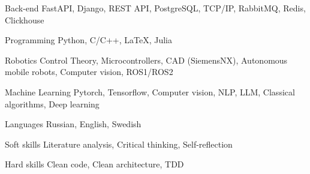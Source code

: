 

\begin{cvskills}

  \cvskill
    {Back-end} %
    {FastAPI, Django, REST API, PostgreSQL, TCP/IP, RabbitMQ, Redis, Clickhouse} %

  \cvskill
    {Programming} %
    {Python, C/C++, LaTeX, Julia} %

  \cvskill
    {Robotics} %
    {Control Theory, Microcontrollers, CAD (SiemensNX), Autonomous mobile robots, Computer vision, ROS1/ROS2} %

  \cvskill
    {Machine Learning}
    {Pytorch, Tensorflow, Computer vision, NLP, LLM, Classical algorithms, Deep learning}

  \cvskill
    {Languages} %
    {Russian, English, Swedish} %

  \cvskill
    {Soft skills} %
    {Literature analysis, Critical thinking, Self-reflection} %

  \cvskill
    {Hard skills} %
    {Clean code, Clean architecture, TDD} %

\end{cvskills}
